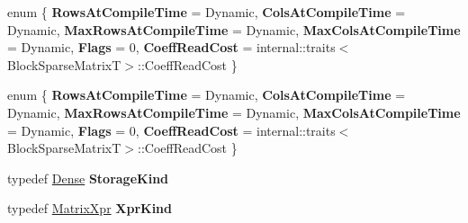 \begin{DoxyCompactItemize}
\item 
\mbox{\label{struct_eigen_1_1internal_1_1traits_3_01_block_sparse_time_dense_product_3_01_block_sparse_matrix_t_00_01_vec_type_01_4_01_4_a12fcc60d2fe6b8a0e5f09203c440599e}} 
enum \{ \newline
{\bfseries Rows\+At\+Compile\+Time} = Dynamic, 
{\bfseries Cols\+At\+Compile\+Time} = Dynamic, 
{\bfseries Max\+Rows\+At\+Compile\+Time} = Dynamic, 
{\bfseries Max\+Cols\+At\+Compile\+Time} = Dynamic, 
\newline
{\bfseries Flags} = 0, 
{\bfseries Coeff\+Read\+Cost} = internal\+:\+:traits$<$Block\+Sparse\+MatrixT$>$\+:\+:Coeff\+Read\+Cost
 \}
\item 
\mbox{\label{struct_eigen_1_1internal_1_1traits_3_01_block_sparse_time_dense_product_3_01_block_sparse_matrix_t_00_01_vec_type_01_4_01_4_a80cb3e76dca052a477c4176cfff3b0b5}} 
enum \{ \newline
{\bfseries Rows\+At\+Compile\+Time} = Dynamic, 
{\bfseries Cols\+At\+Compile\+Time} = Dynamic, 
{\bfseries Max\+Rows\+At\+Compile\+Time} = Dynamic, 
{\bfseries Max\+Cols\+At\+Compile\+Time} = Dynamic, 
\newline
{\bfseries Flags} = 0, 
{\bfseries Coeff\+Read\+Cost} = internal\+:\+:traits$<$Block\+Sparse\+MatrixT$>$\+:\+:Coeff\+Read\+Cost
 \}
\item 
\mbox{\label{struct_eigen_1_1internal_1_1traits_3_01_block_sparse_time_dense_product_3_01_block_sparse_matrix_t_00_01_vec_type_01_4_01_4_a387208e4d6d296d54341f012ec0455bd}} 
typedef \hyperlink{struct_eigen_1_1_dense}{Dense} {\bfseries Storage\+Kind}
\item 
\mbox{\label{struct_eigen_1_1internal_1_1traits_3_01_block_sparse_time_dense_product_3_01_block_sparse_matrix_t_00_01_vec_type_01_4_01_4_a8f4b16d01b6febf4bbd6c8f1a4c9fe29}} 
typedef \hyperlink{struct_eigen_1_1_matrix_xpr}{Matrix\+Xpr} {\bfseries Xpr\+Kind}

\end{DoxyCompactItemize}
